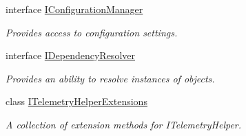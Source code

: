 \begin{DoxyCompactItemize}
interface \hyperlink{interfaceCqrs_1_1Configuration_1_1IConfigurationManager}{I\+Configuration\+Manager}
\begin{DoxyCompactList}\small\item\em Provides access to configuration settings. \end{DoxyCompactList}\item 
interface \hyperlink{interfaceCqrs_1_1Configuration_1_1IDependencyResolver}{I\+Dependency\+Resolver}
\begin{DoxyCompactList}\small\item\em Provides an ability to resolve instances of objects. \end{DoxyCompactList}\item 
class \hyperlink{classCqrs_1_1Configuration_1_1ITelemetryHelperExtensions}{I\+Telemetry\+Helper\+Extensions}
\begin{DoxyCompactList}\small\item\em A collection of extension methods for I\+Telemetry\+Helper. \end{DoxyCompactList}\end{DoxyCompactItemize}
